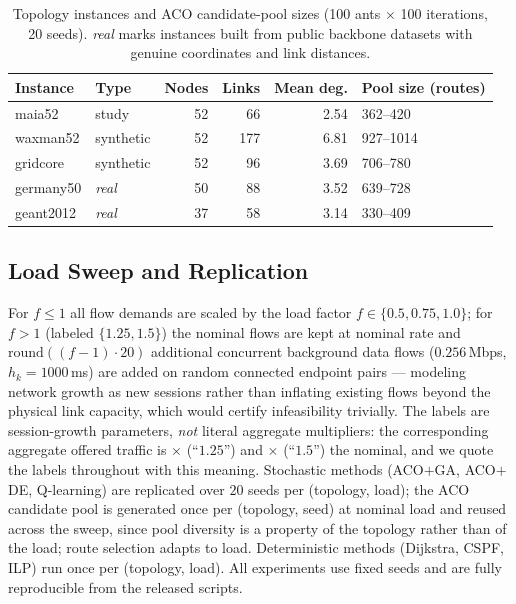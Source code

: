 \documentclass[journal]{IEEEtran}
\begin{document}
\begin{table}[!t]
\caption{Topology instances and ACO candidate-pool sizes (100 ants
$\times$ 100 iterations, 20 seeds). \emph{real} marks instances built from
public backbone datasets with genuine coordinates and link distances.}
\label{tab:topo}
\centering
\begin{tabular}{@{}llrrrl@{}}
\toprule
Instance & Type & Nodes & Links & Mean deg. & Pool size (routes)\\
\midrule
maia52 & study & 52 & 66 & 2.54 & 362--420\\
waxman52 & synthetic & 52 & 177 & 6.81 & 927--1014\\
gridcore & synthetic & 52 & 96 & 3.69 & 706--780\\
germany50 & \emph{real} & 50 & 88 & 3.52 & 639--728\\
geant2012 & \emph{real} & 37 & 58 & 3.14 & 330--409\\
\bottomrule
\end{tabular}
\end{table}

\subsection{Load Sweep and Replication}
For $f\le 1$ all flow demands are scaled by the load factor
$f\in\{0.5, 0.75, 1.0\}$; for $f>1$ (labeled $\{1.25, 1.5\}$) the nominal
flows are kept at nominal rate and
$\mathrm{round}((f{-}1)\!\cdot\!20)$ additional concurrent background data
flows ($0.256$\,Mbps, $h_k{=}1000$\,ms) are added on random connected
endpoint pairs --- modeling network growth as new sessions rather than
inflating existing flows beyond the physical link capacity, which would
certify infeasibility trivially. The labels are session-growth parameters,
\emph{not} literal aggregate multipliers: the corresponding aggregate
offered traffic is \LoadRatioHigh$\times$ (``$1.25$'') and
\LoadRatioMax$\times$ (``$1.5$'') the nominal, and we quote the labels
throughout with this meaning. Stochastic methods (ACO$+$GA,
ACO$+$DE, Q-learning) are replicated over $20$ seeds per (topology, load);
the ACO candidate pool is generated once per (topology, seed) at nominal
load and reused across the sweep, since pool diversity is a property of the
topology rather than of the load; route selection adapts to load.
Deterministic methods (Dijkstra, CSPF, ILP) run once per (topology, load).
All experiments use fixed seeds and are fully reproducible from the released
scripts.
\end{document}
